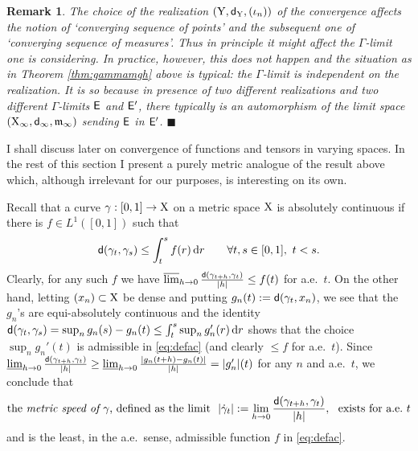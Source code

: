 \documentclass[11pt]{article}
\numberwithin{equation}{section}
\newtheorem{remark}[theorem]{Remark}
\newcommand{\X}{{\rm X}}
\newcommand{\Y}{{\rm Y}}
\newcommand{\sfd}{{\sf d}}
\newcommand{\mm}{{\mathfrak m}}
\renewcommand{\d}{{\rm d}}
\newcommand{\lims}{\varlimsup}
\newcommand{\limi}{\varliminf}
\newcommand{\E}{{\sf E}} %
\newcommand{\fr}{\penalty-20\null\hfill$\blacksquare$}         %
\begin{document}
\begin{remark}\label{re:nondipende}{\rm The choice of the realization $(\Y,\sfd_\Y,(\iota_n))$ of the convergence affects the notion of `converging sequence of points' and the subsequent one  of `converging sequence of measures'. Thus in principle it might affect the $\Gamma$-limit one is considering. In practice, however, this does not happen and the situation as in Theorem \ref{thm:gammamgh} above is typical: the $\Gamma$-limit is independent on the realization. It is so because in presence of two different realizations and two different $\Gamma$-limits $\E$ and $\E'$, there typically  is an automorphism of the limit space $(\X_\infty,\sfd_\infty,\mm_\infty)$ sending $\E$ in $\E'$.
}\fr\end{remark}
I shall discuss later on convergence of functions and tensors in varying spaces. In the rest of this section I present a purely metric analogue of the result above which, although irrelevant for our purposes, is interesting on its own.

Recall that a curve $\gamma:[0,1]\to\X$ on a metric space $\X$ is absolutely continuous if there is $f\in L^1([0,1])$ such that
\begin{equation}
\label{eq:defac}
\sfd(\gamma_t,\gamma_s)\leq\int_t^sf(r)\,\d r\qquad\forall t,s\in[0,1],\ t<s.
\end{equation}
Clearly, for any such $f$ we have $\lims_{h\to0}\frac{\sfd(\gamma_{t+h},\gamma_t)}{|h|}\leq f(t)$ for a.e.\ $t$. On the other hand, letting $(x_n)\subset\X$ be dense and putting $g_n(t):=\sfd(\gamma_t,x_n)$, we see that the $g_n$'s are equi-absolutely continuous and the identity $\sfd(\gamma_t,\gamma_s)=\sup_n g_n(s)-g_n(t)\leq \int_t^s\sup_ng_n'(r)\,\d r$ shows that the choice $\sup_ng_n'(t)$ is admissible in \eqref{eq:defac} (and clearly $\leq f$ for a.e.\ $t$). Since $\limi_{h\to 0}\frac{\sfd(\gamma_{t+h},\gamma_t)}{|h|}\geq\limi_{h\to 0}\frac{|g_n(t+h)-g_n(t)|}{|h|}=|g_n'|(t)$ for any $n$ and a.e.\ $t$, we conclude that 
\begin{equation}
\label{eq:metrsp}
\text{the  \emph{metric speed of $\gamma$}, defined as the limit }\  |\dot\gamma_t|:=\lim_{h\to 0}\frac{\sfd(\gamma_{t+h},\gamma_t)}{|h|},\ \text{ exists for a.e.\ $t$}
\end{equation}
and is the least, in the a.e.\ sense, admissible function $f$ in \eqref{eq:defac}. 
\end{document}
